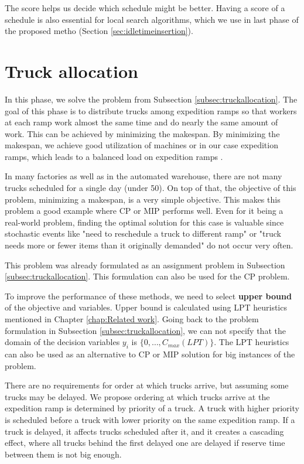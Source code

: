 \documentclass{ctuthesis}
\begin{document}
 The score helps us decide which schedule might be better. Having a score of a schedule is also essential for local search algorithms, which we use in last phase of the proposed metho (Section \ref{sec:idletimeinsertion}).


\section{Truck allocation}
\label{sec:truckallocationprop}
In this phase, we solve the problem from Subsection \ref{subsec:truckallocation}. The goal of this phase is to distribute trucks among expedition ramps so that workers at each ramp work almost the same time and do nearly the same amount of work. This can be achieved by minimizing the makespan. By minimizing the makespan, we achieve good utilization of machines or in our case expedition ramps, which leads to a balanced load on expedition ramps \cite{pinedo}. 

In many factories as well as in the automated warehouse, there are not many trucks scheduled for a single day (under 50). On top of that, the objective of this problem, minimizing a makespan, is a very simple objective. This makes this problem a good example where CP or MIP performs well. Even for it being a real-world problem, finding the optimal solution for this case is valuable since stochastic events like "need to reschedule a truck to different ramp" or "truck needs more or fewer items than it originally demanded" do not occur very often.

This problem was already formulated as an assignment problem in Subsection \ref{subsec:truckallocation}. This formulation can also be used for the CP problem.

To improve the performance of these methods, we need to select \textbf{upper bound} of the objective and variables. Upper bound is calculated using LPT heuristics mentioned in Chapter \ref{chap:Related work}. Going back to the problem formulation in Subsection \ref{subsec:truckallocation}, we can not specify that the domain of the decision variables $y_i$ is $\{0, \ldots, C_{max}(LPT)\}$. The LPT heuristics can also be used as an alternative to CP or MIP solution for big instances of the problem.

There are no requirements for order at which trucks arrive, but assuming some trucks may be delayed. We propose ordering at which trucks arrive at the expedition ramp is determined by priority of a truck. A truck with higher priority is scheduled before a truck with lower priority on the same expedition ramp. If a truck is delayed, it affects trucks scheduled after it, and it creates a cascading effect, where all trucks behind the first delayed one are delayed if reserve time between them is not big enough.
\end{document}
